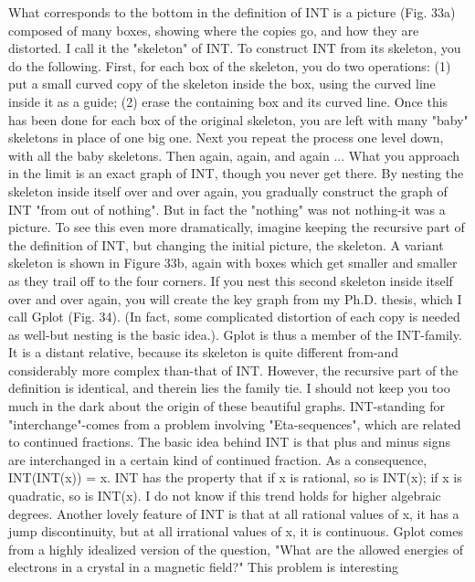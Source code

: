          What corresponds to the bottom in the definition of INT is a picture (Fig. 33a)
composed of many boxes, showing where the copies go, and how they are distorted. I call
it the "skeleton" of INT. To construct INT from its skeleton, you do the following. First,
for each box of the skeleton, you do two operations: (1) put a small curved copy of the
skeleton inside the box, using the curved line inside it as a guide; (2) erase the containing
box and its curved line. Once this has been done for each box of the original skeleton,
you are left with many "baby" skeletons in place of one big one. Next you repeat the
process one level down, with all the baby skeletons. Then again, again, and again ... What
you approach in the limit is an exact graph of INT, though you never get there. By
nesting the skeleton inside itself over and over again, you gradually construct the graph
of INT "from out of nothing". But in fact the "nothing" was not nothing-it was a picture.
         To see this even more dramatically, imagine keeping the recursive part of the
definition of INT, but changing the initial picture, the skeleton. A variant skeleton is
shown in Figure 33b, again with boxes which get smaller and smaller as they trail off to
the four corners. If you nest this second skeleton inside itself over and over again, you
will create the key graph from my Ph.D. thesis, which I call Gplot (Fig. 34). (In fact,
some complicated distortion of each copy is needed as well-but nesting is the basic idea.).
         Gplot is thus a member of the INT-family. It is a distant relative, because its
skeleton is quite different from-and considerably more complex than-that of INT.
However, the recursive part of the definition is identical, and therein lies the family tie.
I should not keep you too much in the dark about the origin of these beautiful graphs.
INT-standing for "interchange"-comes from a problem involving "Eta-sequences", which
are related to continued fractions. The basic idea behind INT is that plus and minus signs
are interchanged in a certain kind of continued fraction. As a consequence, INT(INT(x))
= x. INT has the property that if x is rational, so is INT(x); if x is quadratic, so is INT(x).
I do not know if this trend holds for higher algebraic degrees. Another lovely feature of
INT is that at all rational values of x, it has a jump discontinuity, but at all irrational
values of x, it is continuous.
         Gplot comes from a highly idealized version of the question, "What are the
allowed energies of electrons in a crystal in a magnetic field?" This problem is interesting
